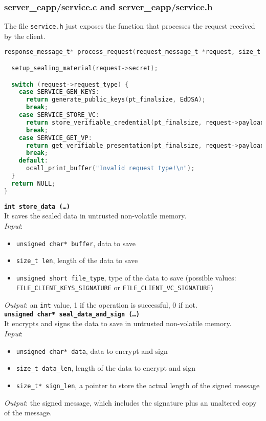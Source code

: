 \newpage
\subsubsection{server\_eapp/service.c and server\_eapp/service.h}
\label{service.c}
The file \texttt{service.h} just exposes the function that processes the request received by the client. \\   
\begin{lstlisting}[language=C,frame=single]
response_message_t* process_request(request_message_t *request, size_t *pt_finalsize) {

  setup_sealing_material(request->secret);

  switch (request->request_type) {
    case SERVICE_GEN_KEYS:
      return generate_public_keys(pt_finalsize, EdDSA);
      break;
    case SERVICE_STORE_VC:
      return store_verifiable_credential(pt_finalsize, request->payload, request->len);
      break;
    case SERVICE_GET_VP:
      return get_verifiable_presentation(pt_finalsize, request->payload, request->len, EdDSA);
      break;
    default:  
      ocall_print_buffer("Invalid request type!\n");
  }
  return NULL;
}
\end{lstlisting}

\noindent
\texttt{\bfseries int store\_data (\dots)}\\
It saves the sealed data in untrusted non-volatile memory. \\
\textit{Input}:
\begin{itemize}[noitemsep,nolistsep]
  \item \texttt{unsigned char* buffer}, data to save
  \item \texttt{size\_t len}, length of the data to save
  \item \texttt{unsigned short file\_type}, type of the data to save (possible values: \texttt{FILE\_CLI\-ENT\_KEYS\_SIGNATURE} or \texttt{FILE\_CLIENT\_VC\_SIGNATURE})
\end{itemize}
\textit{Output}: an \texttt{int} value, 1 if the operation is successful, 0 if not. \\

\noindent
\texttt{\bfseries unsigned char* seal\_data\_and\_sign (\dots)}\\
It encrypts and signs the data to save in untrusted non-volatile memory. \\
\textit{Input}:
\begin{itemize}[noitemsep,nolistsep]
  \item \texttt{unsigned char* data}, data to encrypt and sign
  \item \texttt{size\_t data\_len}, length of the data to encrypt and sign
  \item \texttt{size\_t* sign\_len}, a pointer to store the actual length of the signed message
\end{itemize}
\textit{Output}: the signed message, which includes the signature plus an unaltered copy of the message. \\


